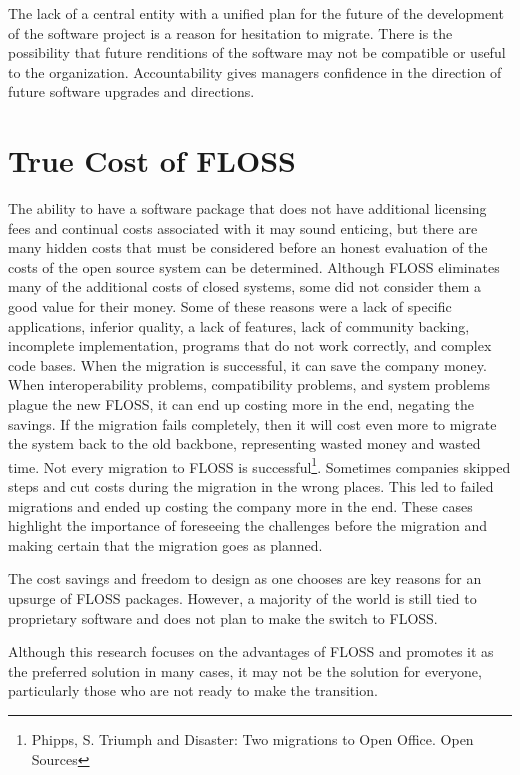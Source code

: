   The lack of a central entity with a unified plan for the future of the development of the software project is a reason for hesitation to migrate.
  There is the possibility that future renditions of the software may not be compatible or useful to the organization.
  Accountability gives managers confidence in the direction of future software upgrades and directions. 
 

 \section{True Cost of FLOSS}
 The ability to have a software package that does not have additional licensing fees and continual costs associated with it may sound enticing, but there are many hidden costs that must be considered before an honest evaluation of the costs of the open source system can be determined. Although FLOSS eliminates many of the additional costs of closed systems, some did not consider them a good value for their money. Some of these reasons were a lack of specific applications, inferior quality, a lack of features, lack of community backing, incomplete implementation, programs that do not work correctly, and complex code bases.
 When the migration is successful, it can save the company money. When interoperability problems, compatibility problems, and system problems plague the new FLOSS, it can end up costing more in the end, negating the savings. If the migration fails completely, then it will cost even more to migrate the system back to the old backbone, representing wasted money and wasted time. Not every migration to FLOSS is successful\footnote{Phipps, S. Triumph and Disaster: Two migrations to Open Office. Open Sources}. Sometimes companies skipped steps and cut costs during the migration in the wrong places. This led to failed migrations and ended up costing the company more in the end. These cases highlight the importance of foreseeing the challenges before the migration and making certain that the migration goes as planned. 
 
 The cost savings and freedom to design as one chooses are key reasons for an upsurge of FLOSS packages. However, a majority of the world is still tied to proprietary software and does not plan to make the switch to FLOSS. 
 

 
 Although this research focuses on the advantages of FLOSS  and promotes it as the preferred solution in many cases, it may not be the solution for everyone, particularly those who are not ready to make the transition. 
 

